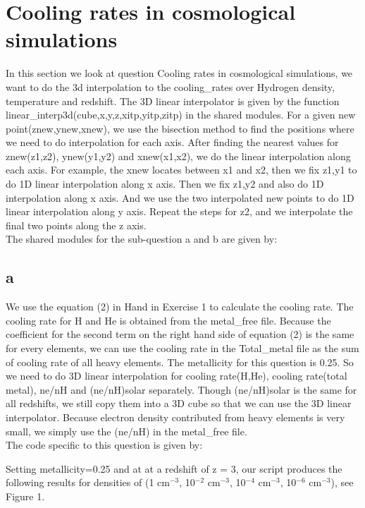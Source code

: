 \section{Cooling rates in cosmological simulations}

In this section we look at question Cooling rates in cosmological simulations,
we want to do the 3d interpolation to the cooling\_rates over Hydrogen density, temperature and redshift.
The 3D linear interpolator is given by the function linear\_interp3d(cube,x,y,z,xitp,yitp,zitp) in the shared modules.
For a given new point(znew,ynew,xnew), we use the bisection method to find the positions where we need to do interpolation for each axis.
After finding the nearest values for znew(z1,z2), ynew(y1,y2) and xnew(x1,x2), we do the linear interpolation along each axis.
For example, the xnew locates between x1 and x2, then we fix z1,y1 to do 1D linear interpolation along x axis.
Then we fix z1,y2 and also do 1D interpolation along x axis. And we use the two interpolated new points to do 1D linear interpolation along y axis.
Repeat the steps for z2, and we interpolate the final two points along the z axis.\\

The shared modules for the sub-question a and b are given by:


\subsection{a}
We use the equation (2) in Hand in Exercise 1 to calculate the cooling rate. The cooling rate for H and He is obtained from the metal\_free file.
Because the coefficient for the second term on the right hand side of equation (2) is the same for every elements,
we can use the cooling rate in the Total\_metal file as the sum of cooling rate of all heavy elements. The metallicity for this question is 0.25.
So we need to do 3D linear interpolation for cooling rate(H,He), cooling rate(total metal), ne/nH and (ne/nH)solar separately.
Though (ne/nH)solar is the same for all redshifts, we still copy them into a 3D cube so that we can use the 3D linear interpolator.
Because electron density contributed from heavy elements is very small, we simply use the (ne/nH) in the metal\_free file.\\

The code specific to this question is given by:


Setting metallicity=0.25 and at at a redshift of z = 3, our script produces the following results for densities of (1 cm$^{-3}$, 10$^{-2}$ cm$^{-3}$, 10$^{-4}$ cm$^{-3}$, 10$^{-6}$ cm$^{-3}$), see Figure 1.



